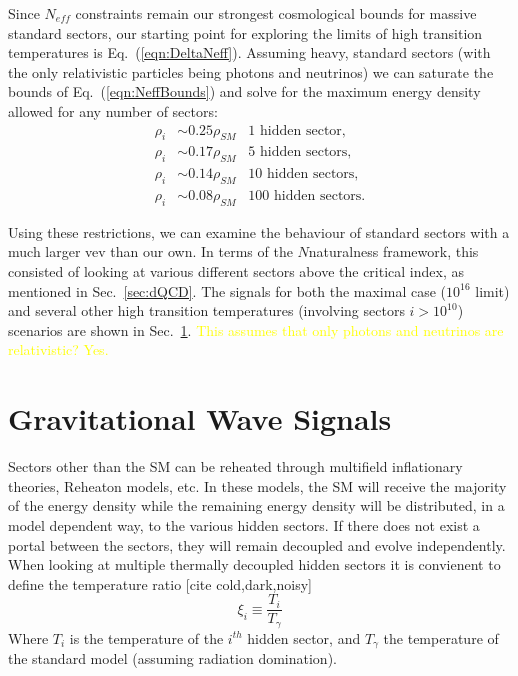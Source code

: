 \documentclass[nofootinbib,twocolumn,preprintnumbers]{revtex4-1}
\begin{document}
Since $N_{eff}$ constraints remain our strongest cosmological bounds for massive standard sectors, our starting point for exploring the limits of high transition temperatures is Eq.~(\ref{eqn:DeltaNeff}). Assuming heavy, standard sectors (with the only relativistic particles being photons and neutrinos) we can saturate the bounds of Eq.~(\ref{eqn:NeffBounds}) and solve for the maximum energy density allowed for any number of sectors:
\begin{equation}\label{eqn:energyDensityAllowed}
\begin{split}
\rho_i &\sim 0.25 \rho_{SM} \,\,\,\,\, \mathrm{1}\,\, \mathrm{hidden}\,\, \mathrm{sector},
\\
\rho_i &\sim 0.17 \rho_{SM} \,\,\,\,\, \mathrm{5} \,\,\mathrm{hidden}\,\, \mathrm{sectors},
\\
\rho_i &\sim 0.14 \rho_{SM} \,\,\,\,\, \mathrm{10} \,\,\mathrm{hidden}\,\, \mathrm{sectors},
\\
\rho_i &\sim 0.08 \rho_{SM} \,\,\,\,\, \mathrm{100} \,\,\mathrm{hidden}\,\, \mathrm{sectors}.
\end{split}
\end{equation}

Using these restrictions, we can examine the behaviour of standard sectors with a much larger vev than our own. In terms of the $N$naturalness framework, this consisted of looking at various different sectors above the critical index, as mentioned in Sec.~\ref{sec:dQCD}. The signals for both the maximal case ($10^{16}$ limit) and several other high transition temperatures (involving sectors $i > 10^{10}$) scenarios are shown in Sec.~\ref{sec:gw}. \textcolor{yellow}{This assumes that only photons and neutrinos are relativistic? Yes.}

\section{Gravitational Wave Signals}

\label{sec:gw}
Sectors other than the SM can be reheated through multifield inflationary theories, Reheaton models, etc. In these models, the SM will receive the majority of the energy density while the remaining energy density will be distributed, in a model dependent way, to the various hidden sectors. If there does not exist a portal between the sectors, they will remain decoupled and evolve independently. When looking at multiple thermally decoupled hidden sectors it is convienent to define the temperature ratio [cite cold,dark,noisy]
\begin{equation}
\xi_i \equiv  \frac{T_{i}}{T_{\gamma}}
\end{equation}
Where $T_{i}$ is the temperature of the $i^{th}$ hidden sector, and $T_{\gamma}$ the temperature of the standard model (assuming radiation domination).
\end{document}
